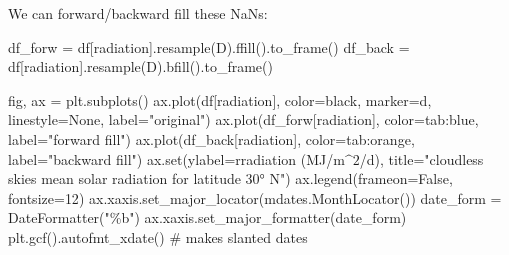 \documentclass[
  letterpaper,
  DIV=11,
  numbers=noendperiod,
  oneside]{scrreprt}
\newenvironment{Shaded}{\begin{snugshade}}{\end{snugshade}}
\newcommand{\BuiltInTok}[1]{\textcolor[rgb]{0.00,0.23,0.31}{#1}}
\newcommand{\CommentTok}[1]{\textcolor[rgb]{0.37,0.37,0.37}{#1}}
\newcommand{\DecValTok}[1]{\textcolor[rgb]{0.68,0.00,0.00}{#1}}
\newcommand{\NormalTok}[1]{\textcolor[rgb]{0.00,0.23,0.31}{#1}}
\newcommand{\OperatorTok}[1]{\textcolor[rgb]{0.37,0.37,0.37}{#1}}
\newcommand{\StringTok}[1]{\textcolor[rgb]{0.13,0.47,0.30}{#1}}
\newcommand{\VariableTok}[1]{\textcolor[rgb]{0.07,0.07,0.07}{#1}}
\newcommand{\VerbatimStringTok}[1]{\textcolor[rgb]{0.13,0.47,0.30}{#1}}
\begin{document}
We can forward/backward fill these NaNs:

\begin{Shaded}
\begin{Highlighting}[]
\NormalTok{df\_forw }\OperatorTok{=}\NormalTok{ df[}\StringTok{\textquotesingle{}radiation\textquotesingle{}}\NormalTok{].resample(}\StringTok{\textquotesingle{}D\textquotesingle{}}\NormalTok{).ffill().to\_frame()}
\NormalTok{df\_back }\OperatorTok{=}\NormalTok{ df[}\StringTok{\textquotesingle{}radiation\textquotesingle{}}\NormalTok{].resample(}\StringTok{\textquotesingle{}D\textquotesingle{}}\NormalTok{).bfill().to\_frame()}
\end{Highlighting}
\end{Shaded}

\begin{Shaded}
\begin{Highlighting}[]
\NormalTok{fig, ax }\OperatorTok{=}\NormalTok{ plt.subplots()}
\NormalTok{ax.plot(df[}\StringTok{\textquotesingle{}radiation\textquotesingle{}}\NormalTok{], color}\OperatorTok{=}\StringTok{\textquotesingle{}black\textquotesingle{}}\NormalTok{, marker}\OperatorTok{=}\StringTok{\textquotesingle{}d\textquotesingle{}}\NormalTok{, linestyle}\OperatorTok{=}\StringTok{\textquotesingle{}None\textquotesingle{}}\NormalTok{, label}\OperatorTok{=}\StringTok{"original"}\NormalTok{)}
\NormalTok{ax.plot(df\_forw[}\StringTok{\textquotesingle{}radiation\textquotesingle{}}\NormalTok{], color}\OperatorTok{=}\StringTok{\textquotesingle{}tab:blue\textquotesingle{}}\NormalTok{, label}\OperatorTok{=}\StringTok{"forward fill"}\NormalTok{)}
\NormalTok{ax.plot(df\_back[}\StringTok{\textquotesingle{}radiation\textquotesingle{}}\NormalTok{], color}\OperatorTok{=}\StringTok{\textquotesingle{}tab:orange\textquotesingle{}}\NormalTok{, label}\OperatorTok{=}\StringTok{"backward fill"}\NormalTok{)}
\NormalTok{ax.}\BuiltInTok{set}\NormalTok{(ylabel}\OperatorTok{=}\VerbatimStringTok{r\textquotesingle{}radiation (MJ/m$\^{}2$/d)\textquotesingle{}}\NormalTok{,}
\NormalTok{       title}\OperatorTok{=}\StringTok{"cloudless skies mean solar radiation for latitude 30° N"}\NormalTok{)}
\NormalTok{ax.legend(frameon}\OperatorTok{=}\VariableTok{False}\NormalTok{, fontsize}\OperatorTok{=}\DecValTok{12}\NormalTok{)}
\NormalTok{ax.xaxis.set\_major\_locator(mdates.MonthLocator())}
\NormalTok{date\_form }\OperatorTok{=}\NormalTok{ DateFormatter(}\StringTok{"\%b"}\NormalTok{)}
\NormalTok{ax.xaxis.set\_major\_formatter(date\_form)}
\NormalTok{plt.gcf().autofmt\_xdate()  }\CommentTok{\# makes slanted dates}
\end{Highlighting}
\end{Shaded}
\end{document}
